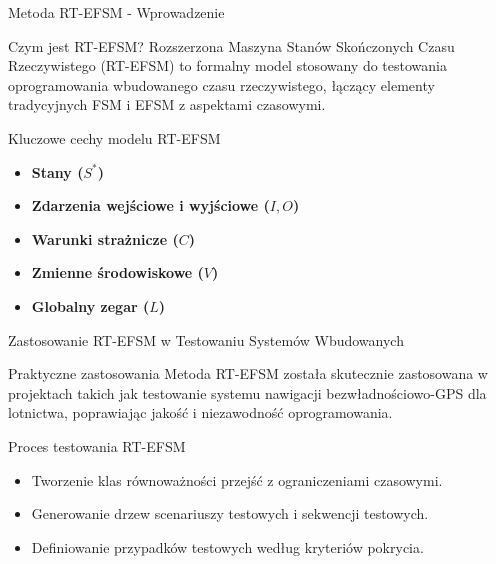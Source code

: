 \documentclass{beamer}
\begin{document}
\begin{frame}{Metoda RT-EFSM - Wprowadzenie}
  \begin{block}{Czym jest RT-EFSM?}
    Rozszerzona Maszyna Stanów Skończonych Czasu Rzeczywistego (RT-EFSM) to formalny model stosowany do testowania oprogramowania wbudowanego czasu rzeczywistego,
    łączący elementy tradycyjnych FSM i EFSM z aspektami czasowymi.
  \end{block}
  \begin{block}{Kluczowe cechy modelu RT-EFSM}
    \begin{itemize}
      \item \textbf{Stany (\(S^*\))}
      \item \textbf{Zdarzenia wejściowe i wyjściowe (\(I, O\))}
      \item \textbf{Warunki strażnicze (\(C\))}
      \item \textbf{Zmienne środowiskowe (\(V\))}
      \item \textbf{Globalny zegar (\(L\))}
    \end{itemize}
  \end{block}
\end{frame}

\begin{frame}{Zastosowanie RT-EFSM w Testowaniu Systemów Wbudowanych}
  \begin{block}{Praktyczne zastosowania}
    Metoda RT-EFSM została skutecznie zastosowana w projektach takich jak testowanie systemu nawigacji bezwładnościowo-GPS dla lotnictwa,
    poprawiając jakość i niezawodność oprogramowania.
  \end{block}

  \begin{block}{Proces testowania RT-EFSM}
    \begin{itemize}
      \item Tworzenie klas równoważności przejść z ograniczeniami czasowymi.
      \item Generowanie drzew scenariuszy testowych i sekwencji testowych.
      \item Definiowanie przypadków testowych według kryteriów pokrycia.
    \end{itemize}
  \end{block}
\end{frame}
\end{document}
